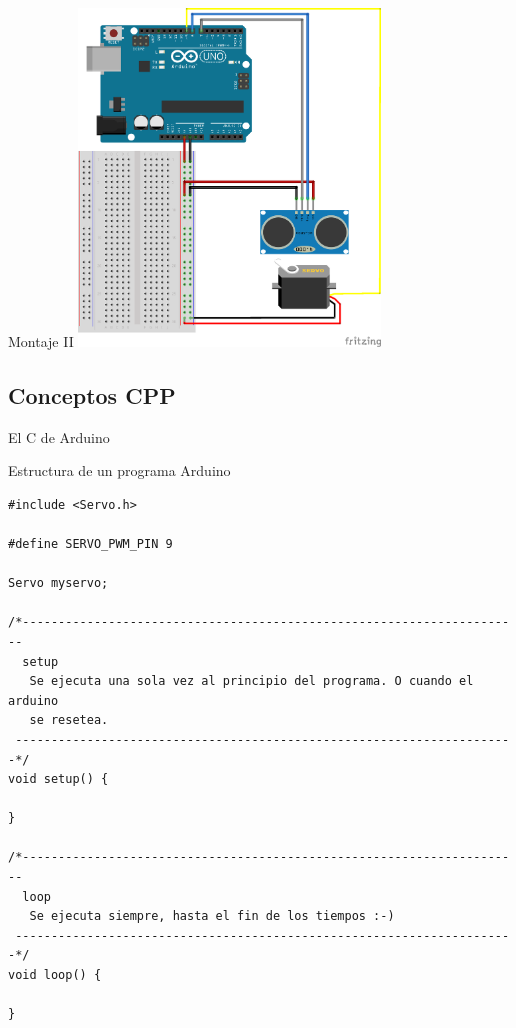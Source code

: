 \begin{frame}{Montaje II}
  \includegraphics [width=0.6\textwidth]{SODAR_diagrama.png}
\end{frame}

\subsection{Conceptos CPP}{El C de Arduino}

\begin{frame}[fragile]{Estructura de un programa Arduino}

\begin{lstlisting}
#include <Servo.h>     

#define SERVO_PWM_PIN 9

Servo myservo;         

/*----------------------------------------------------------------------
  setup
   Se ejecuta una sola vez al principio del programa. O cuando el arduino
   se resetea.
 ----------------------------------------------------------------------*/
void setup() {
  
}

/*----------------------------------------------------------------------
  loop
   Se ejecuta siempre, hasta el fin de los tiempos :-)
 ----------------------------------------------------------------------*/
void loop() {

}
\end{lstlisting}

\end{frame}

